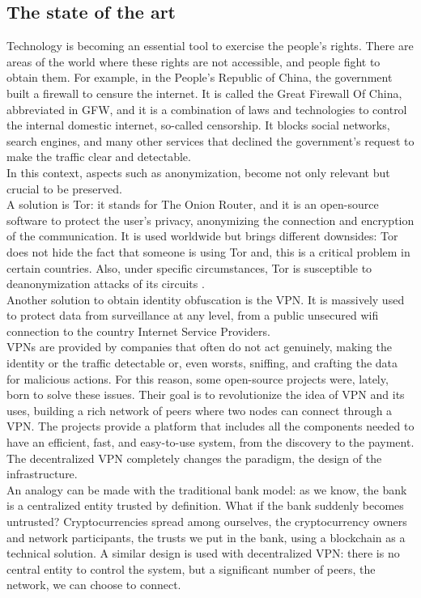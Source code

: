 \documentclass[12pt]{article}
\begin{document}
	\subsection{The state of the art}
	Technology is becoming an essential tool to exercise the people's rights. There are areas of the world where these rights are not accessible, and people fight to obtain them. For example, in the People's Republic of China, the government built a firewall to censure the internet. It is called the Great Firewall Of China, abbreviated in GFW, and it is a combination of laws and technologies to control the internal domestic internet, so-called censorship. It blocks social networks, search engines, and many other services that declined the government's request to make the traffic clear and detectable.\\
	In this context, aspects such as anonymization, become not only relevant but crucial to be preserved.\\
	A solution is Tor: it stands for The Onion Router, and it is an open-source software to protect the user's privacy, anonymizing the connection and encryption of the communication. It is used worldwide but brings different downsides: Tor does not hide the fact that someone is using Tor and, this is a critical problem in certain countries. Also, under specific circumstances, Tor is susceptible to deanonymization attacks of its circuits \cite{DeanonymizingTorCircuits}.\\
	
	\bigbreak
	Another solution to obtain identity obfuscation is the VPN. It is massively used to protect data from surveillance at any level, from a public unsecured wifi connection to the country Internet Service Providers.\\
	VPNs are provided by companies that often do not act genuinely, making the identity or the traffic detectable or, even worsts, sniffing, and crafting the data for malicious actions. For this reason, some open-source projects were, lately, born to solve these issues. Their goal is to revolutionize the idea of VPN and its uses, building a rich network of peers where two nodes can connect through a VPN. The projects provide a platform that includes all the components needed to have an efficient, fast, and easy-to-use system, from the discovery to the payment.\\
	The decentralized VPN completely changes the paradigm, the design of the infrastructure.\\
	An analogy can be made with the traditional bank model: as we know, the bank is a centralized entity trusted by definition. What if the bank suddenly becomes untrusted? Cryptocurrencies spread among ourselves, the cryptocurrency owners and network participants, the trusts we put in the bank, using a blockchain as a technical solution. 
	A similar design is used with decentralized VPN: there is no central entity to control the system, but a significant number of peers, the network, we can choose to connect.
\end{document}
